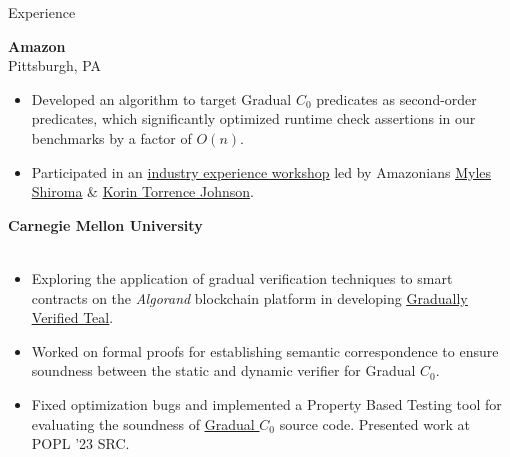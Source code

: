 \begin{rSection}{Experience}
	{\textbf{\large{Amazon}} \hfill \color{darkgray}{06/2023 - 08/2023} 
	\\ \vspace*{1mm}
	 \hfill{Pittsburgh, PA} 
	\\ 
	\color{black}
	\begin{minipage}{40em}
		\begin{itemize}
			\item Developed an algorithm to target Gradual $C_0$ predicates as second-order predicates, which significantly optimized runtime check assertions in our benchmarks by a factor of $O(n)$.
			\item Participated in an \href{https://s3d.cmu.edu/sure/index.html}{\underline{industry experience workshop}} led by Amazonians \href{https://www.linkedin.com/in/myles-shiroma-a850a89/}{\underline{Myles Shiroma}} \& \href{https://www.linkedin.com/in/korin-torrence-johnson/}{\underline{Korin Torrence Johnson}}.
		\end{itemize}
	\end{minipage}}

	{\textbf{\large{Carnegie Mellon University}} \hfill \color{darkgray}{06/2022 - Present} 
	\\ \vspace*{1mm}
	 \hfill \color{darkgray}{Pittsburgh, PA} 
	\\ 
	\color{black}
	\begin{minipage}{40em}
		\begin{itemize}
			\item Exploring the application of gradual verification techniques to smart contracts on the \textit{Algorand} blockchain platform in developing \href{https://github.com/gradual-verification/gradual-TEAL}{\underline{Gradually Verified Teal}}.
			\item Worked on formal proofs for establishing semantic correspondence to ensure soundness between the static and dynamic verifier for Gradual $C_0$. 
			\item Fixed optimization bugs and implemented a Property Based Testing tool for evaluating the soundness of \href{https://github.com/gradual-verification/gvc0}{\underline{Gradual $C_0$}} source code. Presented work at POPL '23 SRC.
		\end{itemize}
	\end{minipage}} 


\end{rSection}
